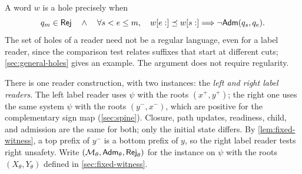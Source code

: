 A word $w$ is a hole precisely when
\begin{equation}\label{eq:g42}
q_m\in \mathsf{Rej}\quad\land\quad
 \forall s<e\le m,\quad w[e:]\preceq w[s:]\Longrightarrow\neg \mathsf{Adm}(q_s,q_e).
\end{equation}
The set of holes of a reader need not be a regular language, even for a
label reader, since the comparison test relates suffixes that start at
different cuts; \cref{sec:general-holes} gives an example. The argument
does not require regularity.

There is one reader construction, with two instances: the \emph{left and
right label readers}. The left label
reader uses $\psi$ with the roots $(x^+,y^+)$; the right one uses the same
system $\psi$ with the roots $(y^-,x^-)$, which are positive for the
complementary sign map (\cref{sec:spine}). Closure, path updates, readiness,
child, and admission are the same for both; only the initial state differs.
By \cref{lem:fixed-witness}, a top prefix of $y^-$ is a bottom prefix of
$y$, so the right label reader tests right unsafety.
Write $(\mathcal M_\theta,\mathsf{Adm}_\theta,\mathsf{Rej}_\theta)$ for the instance on
$\psi$ with the roots $(X_\theta,Y_\theta)$ defined in
\cref{sec:fixed-witness}.

